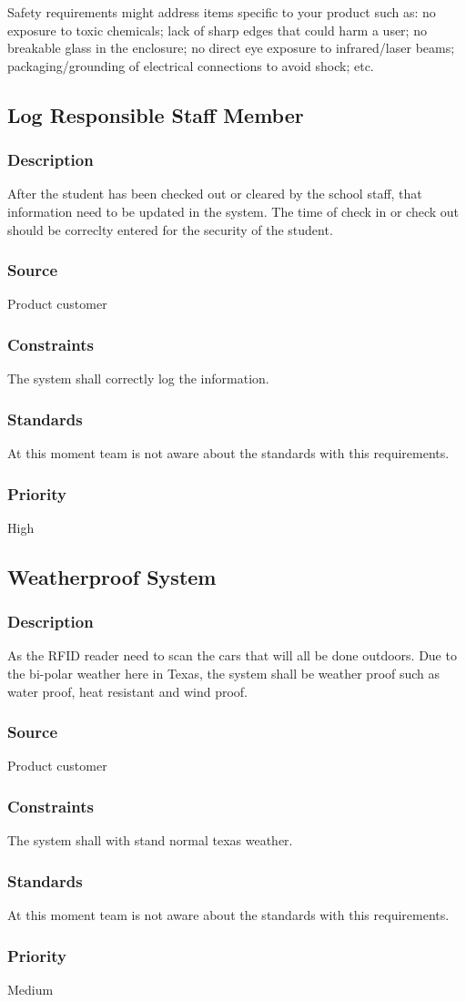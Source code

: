 \quad \quad Safety requirements might 
address items specific to your product such as: no exposure to toxic chemicals; lack 
of sharp edges that could harm a user; no breakable glass in the enclosure; no direct 
eye exposure to infrared/laser beams; packaging/grounding of electrical connections to 
avoid shock; etc.

\subsection{Log Responsible Staff Member}
\subsubsection{Description}
\quad \quad After the student has been checked out or cleared by the school staff, that 
information need to be updated in the system. The time of check in or check out 
should be correclty entered for the security of the student.
\subsubsection{Source}
\quad \quad Product customer
\subsubsection{Constraints}
\quad \quad The system shall correctly log the information.
\subsubsection{Standards}
\quad \quad At this moment team is not aware about the standards with this requirements.
\subsubsection{Priority}
\quad \quad High

\subsection{Weatherproof System}
\subsubsection{Description}
\quad \quad As the RFID reader need to scan the cars that will all be done outdoors. Due to the 
\quad \quad bi-polar weather here in Texas, the system shall be weather proof such as water proof, 
heat resistant and wind proof.
\subsubsection{Source}
\quad \quad Product customer
\subsubsection{Constraints}
\quad \quad The system shall with stand normal texas weather.
\subsubsection{Standards}
\quad \quad At this moment team is not aware about the standards with this requirements.
\subsubsection{Priority}
\quad \quad Medium

